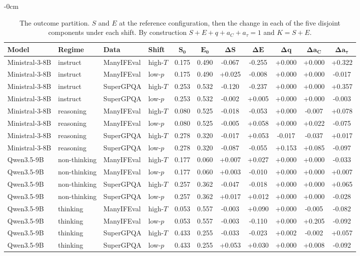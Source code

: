 \begin{table}[H]
\begin{adjustwidth}{-\extralength}{0cm}
\footnotesize
\caption{The outcome partition. $S$ and $E$ at the reference configuration, then the change in each of the five disjoint components under each shift. By construction $S+E+q+a_C+a_\tau=1$ and $K=S+E$.\label{tab:partition}}
\begin{tabular}{llllccccccc}
\toprule
\textbf{Model} & \textbf{Regime} & \textbf{Data} & \textbf{Shift} & $\boldsymbol{S_0}$ & $\boldsymbol{E_0}$ & $\boldsymbol{\Delta S}$ & $\boldsymbol{\Delta E}$ & $\boldsymbol{\Delta q}$ & $\boldsymbol{\Delta a_C}$ & $\boldsymbol{\Delta a_\tau}$ \\
\midrule
Ministral-3-8B & instruct & ManyIFEval & high-$T$ & 0.175 & 0.490 & -0.067 & -0.255 & +0.000 & +0.000 & +0.322 \tabularnewline
Ministral-3-8B & instruct & ManyIFEval & low-$p$ & 0.175 & 0.490 & +0.025 & -0.008 & +0.000 & +0.000 & -0.017 \tabularnewline
Ministral-3-8B & instruct & SuperGPQA & high-$T$ & 0.253 & 0.532 & -0.120 & -0.237 & +0.000 & +0.000 & +0.357 \tabularnewline
Ministral-3-8B & instruct & SuperGPQA & low-$p$ & 0.253 & 0.532 & -0.002 & +0.005 & +0.000 & +0.000 & -0.003 \tabularnewline
Ministral-3-8B & reasoning & ManyIFEval & high-$T$ & 0.080 & 0.525 & -0.018 & -0.053 & +0.000 & -0.007 & +0.078 \tabularnewline
Ministral-3-8B & reasoning & ManyIFEval & low-$p$ & 0.080 & 0.525 & -0.005 & +0.058 & +0.000 & +0.022 & -0.075 \tabularnewline
Ministral-3-8B & reasoning & SuperGPQA & high-$T$ & 0.278 & 0.320 & -0.017 & +0.053 & -0.017 & -0.037 & +0.017 \tabularnewline
Ministral-3-8B & reasoning & SuperGPQA & low-$p$ & 0.278 & 0.320 & -0.087 & -0.055 & +0.153 & +0.085 & -0.097 \tabularnewline
Qwen3.5-9B & non-thinking & ManyIFEval & high-$T$ & 0.177 & 0.060 & +0.007 & +0.027 & +0.000 & +0.000 & -0.033 \tabularnewline
Qwen3.5-9B & non-thinking & ManyIFEval & low-$p$ & 0.177 & 0.060 & +0.003 & -0.010 & +0.000 & +0.000 & +0.007 \tabularnewline
Qwen3.5-9B & non-thinking & SuperGPQA & high-$T$ & 0.257 & 0.362 & -0.047 & -0.018 & +0.000 & +0.000 & +0.065 \tabularnewline
Qwen3.5-9B & non-thinking & SuperGPQA & low-$p$ & 0.257 & 0.362 & +0.017 & +0.012 & +0.000 & +0.000 & -0.028 \tabularnewline
Qwen3.5-9B & thinking & ManyIFEval & high-$T$ & 0.053 & 0.557 & -0.003 & +0.090 & +0.000 & -0.005 & -0.082 \tabularnewline
Qwen3.5-9B & thinking & ManyIFEval & low-$p$ & 0.053 & 0.557 & -0.003 & -0.110 & +0.000 & +0.205 & -0.092 \tabularnewline
Qwen3.5-9B & thinking & SuperGPQA & high-$T$ & 0.433 & 0.255 & -0.033 & -0.023 & +0.002 & -0.002 & +0.057 \tabularnewline
Qwen3.5-9B & thinking & SuperGPQA & low-$p$ & 0.433 & 0.255 & +0.053 & +0.030 & +0.000 & +0.008 & -0.092 \tabularnewline
\bottomrule
\end{tabular}
\end{adjustwidth}
\end{table}
